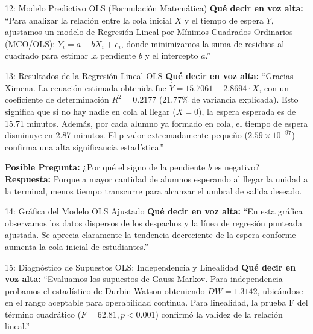 \documentclass[11pt, a4paper]{article}
\begin{document}
\begin{ximenabox}{12: Modelo Predictivo OLS (Formulación Matemática)}
\textbf{Qué decir en voz alta:}
``Para analizar la relación entre la cola inicial $X$ y el tiempo de espera $Y$, ajustamos un modelo de Regresión Lineal por Mínimos Cuadrados Ordinarios (MCO/OLS): $Y_i = a + b X_i + e_i$, donde minimizamos la suma de residuos al cuadrado para estimar la pendiente $b$ y el intercepto $a$.''
\end{ximenabox}

\begin{emmanuelbox}{13: Resultados de la Regresión Lineal OLS}
\textbf{Qué decir en voz alta:}
``Gracias Ximena. La ecuación estimada obtenida fue $\widehat{Y} = 15.7061 - 2.8694 \cdot X$, con un coeficiente de determinación $R^2 = 0.2177$ (21.77\% de variancia explicada). Esto significa que si no hay nadie en cola al llegar ($X=0$), la espera esperada es de 15.71 minutos. Además, por cada alumno ya formado en cola, el tiempo de espera disminuye en 2.87 minutos. El p-valor extremadamente pequeño ($2.59 \times 10^{-97}$) confirma una alta significancia estadística.''

\begin{defensebox}
\textbf{Posible Pregunta:} ¿Por qué el signo de la pendiente $b$ es negativo?\\
\textbf{Respuesta:} Porque a mayor cantidad de alumnos esperando al llegar la unidad a la terminal, menos tiempo transcurre para alcanzar el umbral de salida deseado.
\end{defensebox}
\end{emmanuelbox}

\begin{emmanuelbox}{14: Gráfica del Modelo OLS Ajustado}
\textbf{Qué decir en voz alta:}
``En esta gráfica observamos los datos dispersos de los despachos y la línea de regresión punteada ajustada. Se aprecia claramente la tendencia decreciente de la espera conforme aumenta la cola inicial de estudiantes.''
\end{emmanuelbox}

\begin{emmanuelbox}{15: Diagnóstico de Supuestos OLS: Independencia y Linealidad}
\textbf{Qué decir en voz alta:}
``Evaluamos los supuestos de Gauss-Markov. Para independencia probamos el estadístico de Durbin-Watson obteniendo $DW = 1.3142$, ubicándose en el rango aceptable para operabilidad continua. Para linealidad, la prueba F del término cuadrático ($F = 62.81, p < 0.001$) confirmó la validez de la relación lineal.''
\end{emmanuelbox}
\end{document}
